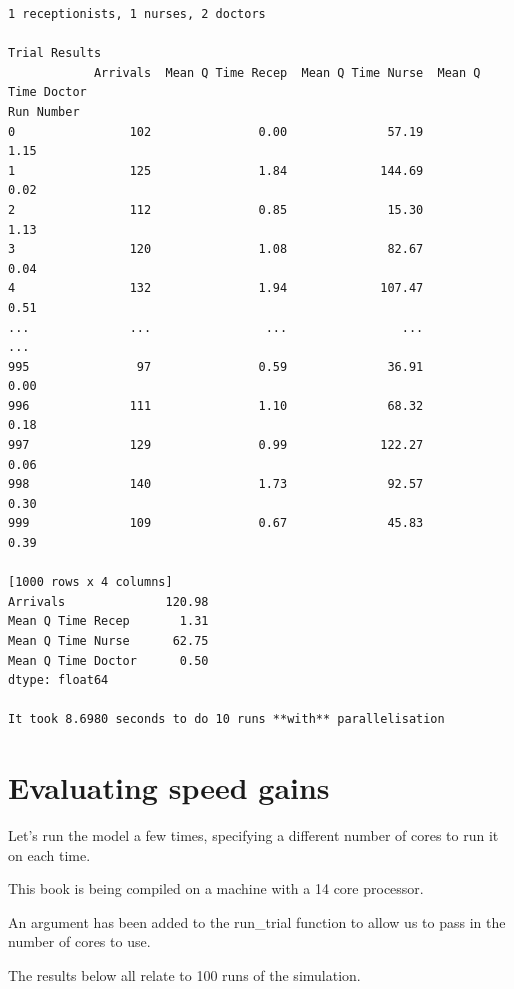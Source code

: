 \documentclass[
  letterpaper,
  DIV=11,
  numbers=noendperiod]{scrreprt}
\begin{document}
\begin{verbatim}
1 receptionists, 1 nurses, 2 doctors

Trial Results
            Arrivals  Mean Q Time Recep  Mean Q Time Nurse  Mean Q Time Doctor
Run Number                                                                    
0                102               0.00              57.19                1.15
1                125               1.84             144.69                0.02
2                112               0.85              15.30                1.13
3                120               1.08              82.67                0.04
4                132               1.94             107.47                0.51
...              ...                ...                ...                 ...
995               97               0.59              36.91                0.00
996              111               1.10              68.32                0.18
997              129               0.99             122.27                0.06
998              140               1.73              92.57                0.30
999              109               0.67              45.83                0.39

[1000 rows x 4 columns]
Arrivals              120.98
Mean Q Time Recep       1.31
Mean Q Time Nurse      62.75
Mean Q Time Doctor      0.50
dtype: float64

It took 8.6980 seconds to do 10 runs **with** parallelisation
\end{verbatim}

\section{Evaluating speed gains}\label{evaluating-speed-gains}

Let's run the model a few times, specifying a different number of cores
to run it on each time.

This book is being compiled on a machine with a 14 core processor.

An argument has been added to the run\_trial function to allow us to
pass in the number of cores to use.

The results below all relate to 100 runs of the simulation.
\end{document}
